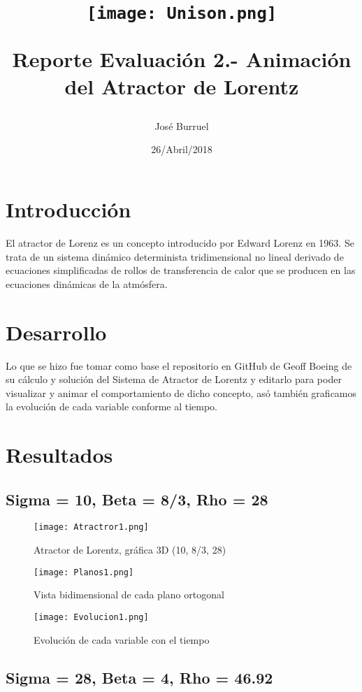 \documentclass{article}
\title{
        \begin{center}
        \texttt{[image: Unison.png]}
        \end{center}
        \newline       
        Reporte Evaluación 2.- Animación del Atractor de Lorentz}
\author{José Burruel}
\date{26/Abril/2018}
\begin{document}
\newpage
\maketitle
\section{Introducción}
El atractor de Lorenz es un concepto introducido por Edward Lorenz en 1963. Se trata de un sistema dinámico determinista tridimensional no lineal derivado de ecuaciones simplificadas de rollos de transferencia de calor que se producen en las ecuaciones dinámicas de la atmósfera.

\section{Desarrollo}
Lo que se hizo fue tomar como base el repositorio en GitHub de Geoff Boeing de su cálculo y solución del Sistema de Atractor de Lorentz y editarlo para poder visualizar y animar el comportamiento de dicho concepto, asó también graficamos la evolución de cada variable conforme al tiempo.

\section{Resultados}
\subsection{Sigma = 10, Beta = 8/3, Rho = 28}

\begin{figure}[H]
\texttt{[image: Atractror1.png]}
\caption{Atractor de Lorentz, gráfica 3D (10, 8/3, 28)}
\end{figure}

\begin{figure}[H]
\texttt{[image: Planos1.png]}
\caption{Vista bidimensional de cada plano ortogonal}
\end{figure}

\begin{figure}[H]
\texttt{[image: Evolucion1.png]}
\caption{Evolución de cada variable con el tiempo}
\end{figure}

\subsection{Sigma = 28, Beta = 4, Rho = 46.92}
\end{document}
